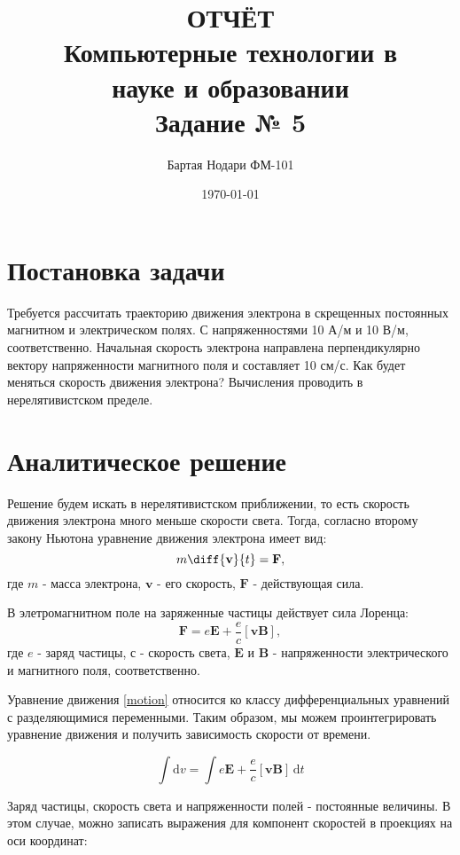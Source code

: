 \documentclass[a4paper]{article}
\author{Бартая Нодари ФМ-101}
\title{ОТЧЁТ\\ Компьютерные технологии в\\ науке и образовании\\ Задание № 5}
\date{\today}
\begin{document}
\maketitle

\section{Постановка задачи}

Требуется рассчитать траекторию движения электрона в скрещенных
постоянных магнитном и электрическом полях. 
С напряженностями 10 А/м и 10 В/м, соответственно. 
Начальная скорость электрона направлена перпендикулярно вектору напряженности магнитного поля и составляет 10 см/с. 
Как будет меняться скорость движения электрона? 
Вычисления проводить в нерелятивистском пределе.

\section{Аналитическое решение}
Решение будем искать в нерелятивистском приближении, то есть скорость движения электрона много меньше скорости света. Тогда, согласно второму закону Ньютона уравнение движения электрона имеет вид:
\begin{equation}\label{motion}
m\diff{\mathbf{v}}{t} = \mathbf{F},
\end{equation}
где $m$ - масса электрона, $\mathbf{v}$ - его скорость, $\mathbf{F}$ - действующая сила.

В элетромагнитном поле на заряженные частицы действует сила Лоренца:
\begin{equation}\label{lorenz}
\mathbf{F} = e \mathbf{E} + \frac{e}{c}\left[\mathbf{vB}\right],
\end{equation}
где $e$ - заряд частицы, $с$ - скорость света, $\mathbf{E}$ и $\mathbf{B}$ - напряженности электрического и магнитного поля, соответственно.

Уравнение движения \eqref{motion} относится ко классу дифференциальных уравнений с разделяющимися переменными. Таким образом, мы можем проинтегрировать уравнение движения и получить зависимость скорости от времени.

\begin{equation}\label{intmotion}
\int \mathrm{d}v =\int e \mathbf{E} + \frac{e}{c}\left[\mathbf{vB}\right] \, \mathrm{d}t
\end{equation}

Заряд частицы, скорость света и напряженности полей - постоянные величины. В этом случае, можно записать выражения для компонент скоростей в проекциях на оси координат:
\end{document}
